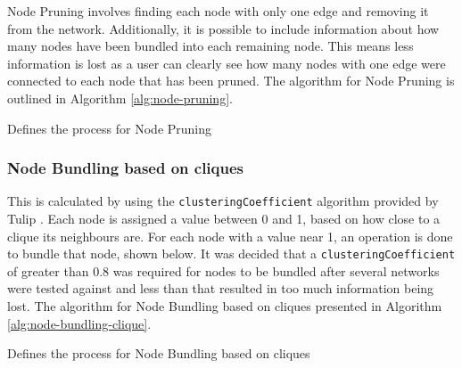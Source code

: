 \documentclass[../dissertation.tex]{subfiles}
\begin{document}
Node Pruning involves finding each node with only one edge and removing it from the network. Additionally, it is possible to include information about how many nodes have been bundled into each remaining node. This means less information is lost as a user can clearly see how many nodes with one edge were connected to each node that has been pruned. The algorithm for Node Pruning is outlined in Algorithm \ref{alg:node-pruning}.

\begin{algorithm}[H]
\caption{Defines the process for Node Pruning}
\label{alg:node-pruning}
\begin{algorithmic}
 
    \ENDIF 
\ENDFOR
{} 
\ENDFOR
\end{algorithmic}
\end{algorithm}

\subsubsection{Node Bundling based on cliques}
\label{sec:impl-node-clique}

This is calculated by using the \texttt{clusteringCoefficient} algorithm provided by Tulip \cite{tulip-clustering-coeff-doc}. Each node is assigned a value between 0 and 1, based on how close to a clique its neighbours are. For each node with a value near 1, an operation is done to bundle that node, shown below. It was decided that a \texttt{clusteringCoefficient} of greater than 0.8 was required for nodes to be bundled after several networks were tested against and less than that resulted in too much information being lost. The algorithm for Node Bundling based on cliques presented in Algorithm \ref{alg:node-bundling-clique}.

\begin{algorithm}[H]
\caption{Defines the process for Node Bundling based on cliques}
\label{alg:node-bundling-clique}
\begin{algorithmic}
 
 
    \ENDIF
\ENDFOR
{}
      
\ENDFOR

\end{algorithmic}
\end{algorithm}
\end{document}
